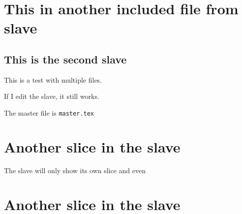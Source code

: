 

\section {This in another included file from slave}


\subsection {This is the second slave}

This is a test with multiple files.


If I edit the slave, it still works.

The master file is \verb"master.tex"

\section {Another slice in the slave}

The slave will only show its own slice and even 

\section {Another slice in the slave}


